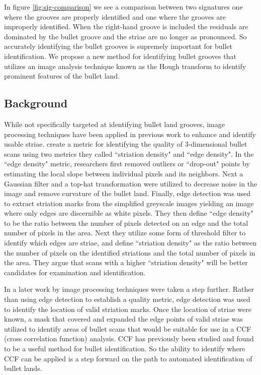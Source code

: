 \documentclass[12pt]{article}\usepackage[]{graphicx}\usepackage[]{color}
\theoremstyle{nonumberplain}
\newcommand{\hh}[1]{{\color{orange}{#1}}}
\begin{document}
In figure \ref{fig:sig-comparison} we see a comparison between two signatures one where the grooves are properly identified and one where the grooves are improperly identified. When the right-hand groove is included the residuals are dominated by the bullet groove and the striae are no longer as pronounced. So accurately identifying the bullet grooves is supremely important for bullet identification. We propose a new method for identifying bullet grooves that utilizes an image analysis technique known as the Hough transform to identify prominent features of the bullet land. 

\subsection{Background}

While not specifically targeted at identifying bullet land grooves, image processing techniques have been applied in previous work to enhance and identify usable striae.  \citet{chu2010} create a metric for identifying the quality of 3-dimensional bullet scans using two metrics they called ``striation density" and ``edge density". \hh{XXX The description of these two metrics is very detailed. Is there a reason for going into that much detail?} In the ``edge density" metric, researchers first removed outliers or ``drop-out" points by estimating the local slope between individual pixels and its neighbors. Next a Gaussian filter and a top-hat transformation were utilized to decrease noise in the image and remove curvature of the bullet land. Finally, edge detection was used to extract striation marks from the simplified greyscale images yielding an image where only edges are discernible as white pixels. They then define ``edge density" to be the ratio between the number of pixels detected on an edge and the total number of pixels in the area. Next they utilize some form of threshold filter to identify which edges are striae, and define ``striation density" as the ratio between the number of pixels on the identified striations and the total number of pixels in the area. They argue that scans with a higher ``striation density" will be better candidates for examination and identification. 

In a later work  by \citet{chu2013} image processing techniques were taken a step further. Rather than using edge detection to establish a quality metric, edge detection was used to identify the location of valid striation marks. Once the location of striae were known, a mask that covered and expanded the edge points of valid striae was utilized to identify areas of bullet scans that would be suitable for use in a CCF (cross correlation function) analysis. CCF has previously been studied \cite{chu2010-ccf} and found to be a useful method for bullet identification. So the ability to identify where CCF can be applied is a step forward on the path to automated identification of bullet lands. \hh{XXX Unfortunately, none of the heuristics described above are made available in algorithmic form to external researchers.}
\end{document}

